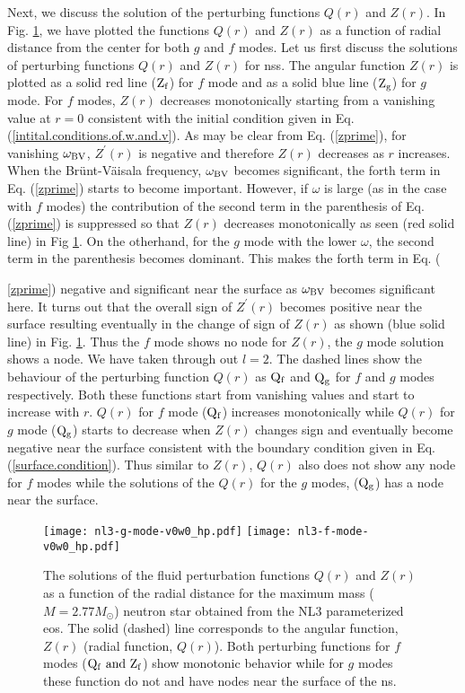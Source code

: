 \documentclass[a4paper, 11pt]{article}
\begin{document}
Next, we discuss the solution of the perturbing functions $Q(r)$ and $Z(r)$. In Fig. \ref{figure:gf-mode-v0w0_hp}, we have plotted the functions $Q(r)$ and $Z(r)$ as a function of radial distance from the center for both $g$ and $f$ modes. Let us first discuss the solutions of perturbing functions $Q(r)$ and $Z(r)$ for \ac{ns}s. The angular function $Z(r)$ is plotted as a solid red line (${\rm Z_f}$) for $f$ mode and as a solid blue line (${\rm Z_g}$) for $g$ mode. For $f$ modes, $Z(r)$ decreases monotonically starting from a vanishing value at $r=0$ consistent with the initial condition given in Eq. (\ref{intital.conditions.of.w.and.v}). As may be clear from Eq. (\ref{zprime}), for vanishing $\omega_{\rm BV}$, $Z^{\prime}(r)$ is negative and therefore $Z(r)$ decreases as $r$ increases. When the Br\" {u}nt-V\" {a}isala frequency, $\omega_{\rm BV}$ becomes significant, the forth term in Eq. (\ref{zprime}) starts to become important. However, if $\omega$ is large (as in the case with $f$ modes) the contribution of the second term in the parenthesis of Eq. (\ref{zprime}) is suppressed so that $Z(r)$ decreases monotonically as seen (red solid line) in Fig \ref{figure:gf-mode-v0w0_hp}. On the otherhand, for the $g$ mode with the lower $\omega$, the second term in the parenthesis becomes dominant. This makes the forth term in Eq. ({\ref{zprime}) negative and significant near the surface as $\omega_{\rm BV}$ becomes significant here. It turns out that the overall sign of $Z^{\prime}(r)$ becomes positive near the surface resulting eventually in the change of sign of $Z(r)$ as shown (blue solid line) in Fig. \ref{figure:gf-mode-v0w0_hp}. Thus the $f$ mode shows no node for $Z(r)$, the $g$ mode solution shows a node. We have taken through out $l=2$. The dashed lines show the behaviour of the perturbing function $Q(r)$ as ${\rm Q_f}$ and ${\rm Q_g}$ for $f$ and $g$ modes respectively. Both these functions start from vanishing values and start to increase with $r$. $Q(r)$ for $f$ mode (${\rm Q_f}$) increases monotonically while $Q(r)$ for $g$ mode (${\rm Q_g}$) starts to decrease when $Z(r)$ changes sign and eventually become negative near the surface consistent with the boundary condition given in Eq. (\ref{surface.condition}). Thus similar to $Z(r)$, $Q(r)$ also does not show any node for $f$ modes while the solutions of the $Q(r)$ for the $g$ modes, (${\rm Q_g}$) has a node near the surface.

\begin{figure}
\centering
\texttt{[image: nl3-g-mode-v0w0\_hp.pdf]}
\texttt{[image: nl3-f-mode-v0w0\_hp.pdf]}
\caption{The solutions of the fluid perturbation functions $Q(r)$ and $Z(r)$ as a function of the radial distance for the maximum mass ($M=2.77M_{\odot}$) neutron star obtained from the NL3 parameterized \ac{eos}. The solid (dashed) line corresponds to the angular function, $Z(r)$ (radial function, $Q(r)$). Both perturbing functions for $f$ modes (${\rm Q_f ~and~ Z_f}$) show monotonic behavior while for $g$ modes these function do not and have nodes near the surface of the \ac{ns}.}
\label{figure:gf-mode-v0w0_hp}
\end{figure}

}
\end{document}
